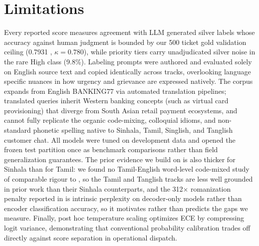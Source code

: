 \section{Limitations}
\label{sec:limitations}

Every reported score measures agreement with LLM generated silver labels whose accuracy against human judgment is bounded by our 500 ticket gold validation ceiling (0.7931 \negf{}, $\kappa = 0.780$), while priority tiers carry unadjudicated silver noise in the rare High class (9.8\%). Labeling 
prompts were authored and evaluated solely on English source text and copied identically across tracks, 
overlooking language specific nuances in how urgency and grievance are expressed natively. The corpus expands from English BANKING77 via automated translation pipelines; translated queries inherit Western banking concepts (such as virtual card provisioning) that diverge from South Asian retail payment ecosystems, and cannot fully replicate the organic code-mixing, colloquial idioms, and non-standard phonetic spelling native to Sinhala, Tamil, Singlish, and Tanglish customer chat. All models were tuned on development data and opened the frozen test partition once as benchmark comparisons rather than field generalization guarantees. The prior evidence we build on is also thicker for Sinhala than for Tamil: we found no Tamil-English word-level code-mixed study of comparable rigour to \cite{smith2020codemixed}, so the Tamil and Tanglish tracks are less well grounded in prior work than their Sinhala counterparts, and the 312$\times$ romanization penalty reported in \cite{rajapakse2026script} is intrinsic perplexity on decoder-only models rather than encoder classification accuracy, so it motivates rather than predicts the gaps we measure. Finally, post hoc temperature scaling optimizes ECE by compressing logit variance, demonstrating that conventional probability calibration trades off directly against score separation in operational dispatch.
